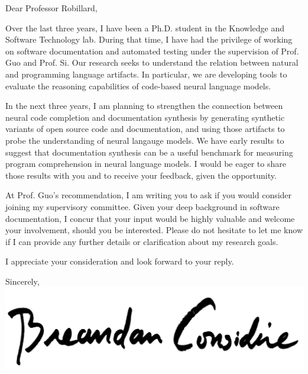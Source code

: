 \documentclass{letter}
\begin{document}
    \begin{letter}{}
        \opening{Dear Professor Robillard,\\}

        Over the last three years, I have been a Ph.D. student in the Knowledge and Software Technology lab. During that time, I have had the privilege of working on software documentation and automated testing under the supervision of Prof. Guo and Prof. Si. Our research seeks to understand the relation between natural and programming language artifacts. In particular, we are developing tools to evaluate the reasoning capabilities of code-based neural language models.

        In the next three years, I am planning to strengthen the connection between neural code completion and documentation synthesis by generating synthetic variants of open source code and documentation, and using those artifacts to probe the understanding of neural langauge models. We have early results to suggest that documentation synthesis can be a useful benchmark for measuring program comprehension in neural language models. I would be eager to share those results with you and to receive your feedback, given the opportunity.

        At Prof. Guo's recommendation, I am writing you to ask if you would consider joining my supervisory committee. Given your deep background in software documentation, I concur that your input would be highly valuable and welcome your involvement, should you be interested. Please do not hesitate to let me know if I can provide any further details or clarification about my research goals.

        I appreciate your consideration and look forward to your reply.\\

        \closing{Sincerely,\\
        \includegraphics[scale=0.06]{signature}\\
        }
    \end{letter}
\end{document}
